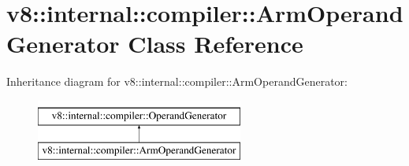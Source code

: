 \hypertarget{classv8_1_1internal_1_1compiler_1_1ArmOperandGenerator}{}\section{v8\+:\+:internal\+:\+:compiler\+:\+:Arm\+Operand\+Generator Class Reference}
\label{classv8_1_1internal_1_1compiler_1_1ArmOperandGenerator}
Inheritance diagram for v8\+:\+:internal\+:\+:compiler\+:\+:Arm\+Operand\+Generator\+:\begin{figure}[H]
\begin{center}
\leavevmode
\includegraphics[height=2.000000cm]{classv8_1_1internal_1_1compiler_1_1ArmOperandGenerator}
\end{center}
\end{figure}
